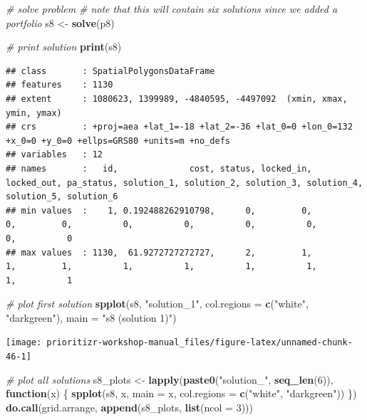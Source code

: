\documentclass[12pt,]{book}
\newenvironment{Shaded}{\begin{snugshade}}{\end{snugshade}}
\newcommand{\KeywordTok}[1]{\textcolor[rgb]{0.13,0.29,0.53}{\textbf{#1}}}
\newcommand{\DataTypeTok}[1]{\textcolor[rgb]{0.13,0.29,0.53}{#1}}
\newcommand{\DecValTok}[1]{\textcolor[rgb]{0.00,0.00,0.81}{#1}}
\newcommand{\StringTok}[1]{\textcolor[rgb]{0.31,0.60,0.02}{#1}}
\newcommand{\CommentTok}[1]{\textcolor[rgb]{0.56,0.35,0.01}{\textit{#1}}}
\newcommand{\ControlFlowTok}[1]{\textcolor[rgb]{0.13,0.29,0.53}{\textbf{#1}}}
\newcommand{\NormalTok}[1]{#1}
\begin{document}
\begin{Shaded}
\begin{Highlighting}[]
\CommentTok{# solve problem}
\CommentTok{# note that this will contain six solutions since we added a portfolio}
\NormalTok{s8 <-}\StringTok{ }\KeywordTok{solve}\NormalTok{(p8)}

\CommentTok{# print solution}
\KeywordTok{print}\NormalTok{(s8)}
\end{Highlighting}
\end{Shaded}

\begin{verbatim}
## class       : SpatialPolygonsDataFrame 
## features    : 1130 
## extent      : 1080623, 1399989, -4840595, -4497092  (xmin, xmax, ymin, ymax)
## crs         : +proj=aea +lat_1=-18 +lat_2=-36 +lat_0=0 +lon_0=132 +x_0=0 +y_0=0 +ellps=GRS80 +units=m +no_defs 
## variables   : 12
## names       :   id,              cost, status, locked_in, locked_out, pa_status, solution_1, solution_2, solution_3, solution_4, solution_5, solution_6 
## min values  :    1, 0.192488262910798,      0,         0,          0,         0,          0,          0,          0,          0,          0,          0 
## max values  : 1130,  61.9272727272727,      2,         1,          1,         1,          1,          1,          1,          1,          1,          1
\end{verbatim}

\begin{Shaded}
\begin{Highlighting}[]
\CommentTok{# plot first solution}
\KeywordTok{spplot}\NormalTok{(s8, }\StringTok{"solution_1"}\NormalTok{, }\DataTypeTok{col.regions =} \KeywordTok{c}\NormalTok{(}\StringTok{"white"}\NormalTok{, }\StringTok{"darkgreen"}\NormalTok{),}
       \DataTypeTok{main =} \StringTok{"s8 (solution 1)"}\NormalTok{)}
\end{Highlighting}
\end{Shaded}

\begin{center}\texttt{[image: prioritizr-workshop-manual\_files/figure-latex/unnamed-chunk-46-1]} \end{center}

\begin{Shaded}
\begin{Highlighting}[]
\CommentTok{# plot all solutions}
\NormalTok{s8_plots <-}\StringTok{ }\KeywordTok{lapply}\NormalTok{(}\KeywordTok{paste0}\NormalTok{(}\StringTok{"solution_"}\NormalTok{, }\KeywordTok{seq_len}\NormalTok{(}\DecValTok{6}\NormalTok{)), }\ControlFlowTok{function}\NormalTok{(x) \{}
  \KeywordTok{spplot}\NormalTok{(s8, x, }\DataTypeTok{main =}\NormalTok{ x, }\DataTypeTok{col.regions =} \KeywordTok{c}\NormalTok{(}\StringTok{"white"}\NormalTok{, }\StringTok{"darkgreen"}\NormalTok{))}
\NormalTok{\})}
\KeywordTok{do.call}\NormalTok{(grid.arrange, }\KeywordTok{append}\NormalTok{(s8_plots, }\KeywordTok{list}\NormalTok{(}\DataTypeTok{ncol =} \DecValTok{3}\NormalTok{)))}
\end{Highlighting}
\end{Shaded}
\end{document}
